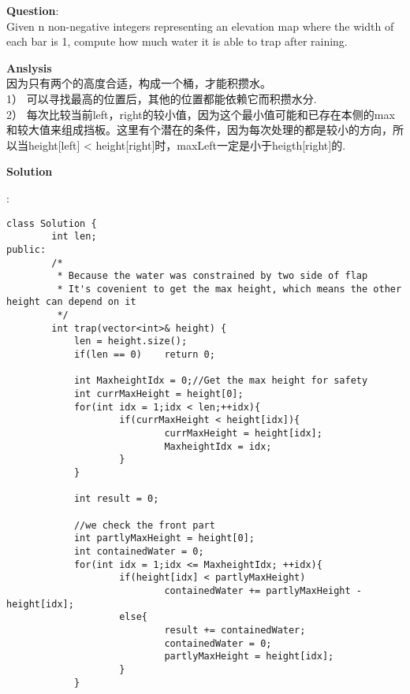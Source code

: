 \begin{description}
    \item{\textbf{Question}}:\\%
		Given n non-negative integers representing an elevation map where the width of each bar is 1, compute how much water it is able to trap after raining.\\

    \item{\textbf{Anslysis}}\\
		因为只有两个的高度合适，构成一个桶，才能积攒水。\\
		1） 可以寻找最高的位置后，其他的位置都能依赖它而积攒水分.\\
		2） 每次比较当前left，right的较小值，因为这个最小值可能和已存在本侧的max和较大值来组成挡板。这里有个潜在的条件，因为每次处理的都是较小的方向，所以当height[left] < height[right]时，maxLeft一定是小于heigth[right]的.\\

    \item{\textbf{Solution}}\\
	\item{} : \\
		\begin{lstlisting}
class Solution {
		int len;
public:
        /*
         * Because the water was constrained by two side of flap
         * It's covenient to get the max height, which means the other height can depend on it 
         */
	    int trap(vector<int>& height) {
			len = height.size();
			if(len == 0)	return 0;

			int MaxheightIdx = 0;//Get the max height for safety
			int currMaxHeight = height[0];
			for(int idx = 1;idx < len;++idx){
					if(currMaxHeight < height[idx]){
							currMaxHeight = height[idx];
                            MaxheightIdx = idx;
                    }
            }

            int result = 0;

            //we check the front part
            int partlyMaxHeight = height[0];
            int containedWater = 0;
            for(int idx = 1;idx <= MaxheightIdx; ++idx){
                    if(height[idx] < partlyMaxHeight)
                            containedWater += partlyMaxHeight - height[idx];
                    else{
                            result += containedWater;
                            containedWater = 0;
                            partlyMaxHeight = height[idx];
                    }
            }


\end{lstlisting}
\end{description}
